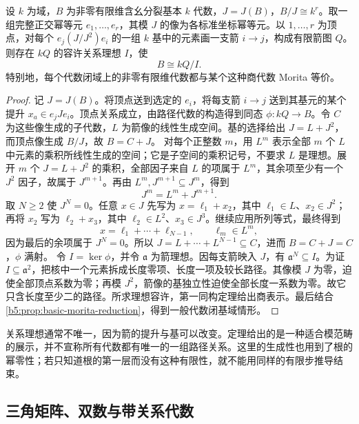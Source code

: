 \begin{theorem}\label{b5:thm:basic-algebra-bound-quiver}
	设 \(k\) 为域，\(B\) 为非零有限维含幺分裂基本 \(k\) 代数，\(J=J(B)\)，\(B/J\cong k^r\)。取一组完整正交幂等元 \(e_1,\ldots,e_r\)，其模 \(J\) 的像为各标准坐标幂等元。以 \(1,\ldots,r\) 为顶点，对每个 \(e_j(J/J^2)e_i\) 的一组 \(k\) 基中的元素画一支箭 \(i\to j\)，构成有限箭图 \(Q\)。则存在 \(kQ\) 的容许关系理想 \(I\)，使
	\[
		B\cong kQ/I.
	\]
	特别地，每个代数闭域上的非零有限维代数都与某个这种商代数 Morita 等价。
\end{theorem}
\begin{proof}
	记 \(J=J(B)\)。将顶点送到选定的 \(e_i\)，将每支箭 \(i\to j\) 送到其基元的某个提升 \(x_a\in e_jJe_i\)。顶点关系成立，由路径代数的构造得到同态 \(\phi:kQ\to B\)。令 \(C\) 为这些像生成的子代数，\(L\) 为箭像的线性生成空间。基的选择给出 \(J=L+J^2\)，而顶点像生成 \(B/J\)，故 \(B=C+J\)。 对每个正整数 \(m\)，用 \(L^m\) 表示全部 \(m\) 个 \(L\) 中元素的乘积所线性生成的空间；它是子空间的乘积记号，不要求 \(L\) 是理想。展开 \(m\) 个 \(J=L+J^2\) 的乘积，全部因子来自 \(L\) 的项属于 \(L^m\)，其余项至少有一个 \(J^2\) 因子，故属于 \(J^{m+1}\)。再由 \(L^m,J^{m+1}\subseteq J^m\)，得到
	\[
		J^m=L^m+J^{m+1}.
	\]
	取 \(N\ge2\) 使 \(J^N=0\)。任意 \(x\in J\) 先写为 \(x=\ell_1+x_2\)，其中 \(\ell_1\in L\)、\(x_2\in J^2\)；再将 \(x_2\) 写为 \(\ell_2+x_3\)，其中 \(\ell_2\in L^2\)、\(x_3\in J^3\)。继续应用所列等式，最终得到
	\[
		x=\ell_1+\cdots+\ell_{N-1},\qquad \ell_m\in L^m,
	\]
	因为最后的余项属于 \(J^N=0\)。所以 \(J=L+\cdots+L^{N-1}\subseteq C\)，进而 \(B=C+J=C\)，\(\phi\) 满射。 令 \(I=\ker\phi\)，并令 \(\mathfrak a\) 为箭理想。因每支箭映入 \(J\)，有 \(\mathfrak a^N\subseteq I\)。为证 \(I\subseteq\mathfrak a^2\)，把核中一个元素拆成长度零项、长度一项及较长路径。其像模 \(J\) 为零，迫使全部顶点系数为零；再模 \(J^2\)，箭像的基独立性迫使全部长度一系数为零。故它只含长度至少二的路径。所求理想容许，第一同构定理给出商表示。最后结合\cref{b5:prop:basic-morita-reduction}，得到一般代数闭基域情形。
\end{proof}
关系理想通常不唯一，因为箭的提升与基可以改变。定理给出的是一种适合模范畴的展示，并不宣称所有代数都有唯一的一组路径关系。这里的生成性也用到了根的幂零性；若只知道根的第一层而没有这种有限性，就不能用同样的有限步推导结束。

\subsection{三角矩阵、双数与带关系代数}
\label{b5:subsec:0905:04}

